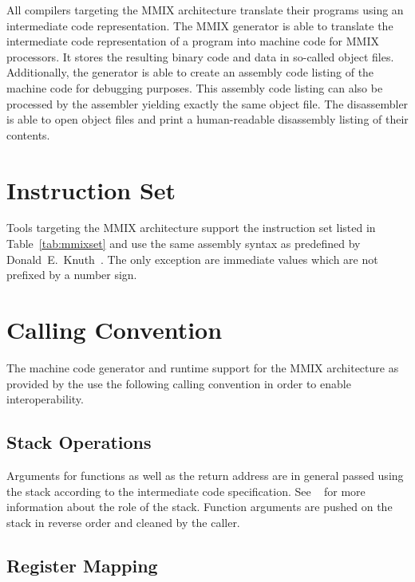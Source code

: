 All compilers targeting the MMIX architecture translate their programs using an intermediate code representation.
The MMIX generator is able to translate the intermediate code representation of a program into machine code for MMIX processors.
It stores the resulting binary code and data in so-called object files.
Additionally, the generator is able to create an assembly code listing of the machine code for debugging purposes.
This assembly code listing can also be processed by the assembler yielding exactly the same object file.
The disassembler is able to open object files and print a human-readable disassembly listing of their contents.
\seeobject\seecode

\section{Instruction Set}

Tools targeting the MMIX architecture support the instruction set listed in Table~\ref{tab:mmixset} and use the same assembly syntax as predefined by Donald~E.\ Knuth~\cite{mmixware}.
The only exception are immediate values which are not prefixed by a number sign.
\seeassembly


\section{Calling Convention}

The machine code generator and runtime support for the MMIX architecture as provided by the \ecs{} use the following calling convention in order to enable interoperability.

\subsection{Stack Operations}

Arguments for functions as well as the return address are in general passed using the stack according to the intermediate code specification.
See \Documentation{}~ for more information about the role of the stack.
Function arguments are pushed on the stack in reverse order and cleaned by the caller.

\subsection{Register Mapping}

